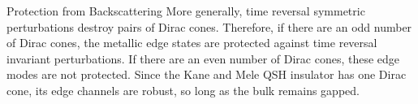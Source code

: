 \documentclass[a4paper,12pt]{article}
\begin{document}
\begin{section}{Protection from Backscattering}
More generally, time reversal symmetric perturbations destroy pairs of Dirac cones.  Therefore, if there are an odd number of Dirac cones, the metallic edge states are protected against time reversal invariant perturbations.  If there are an even number of Dirac cones, these edge modes are not protected.  Since the Kane and Mele QSH insulator has one Dirac cone, its edge channels are robust, so long as the bulk remains gapped.

\end{section}

%
%
%
%
%
\end{document}
